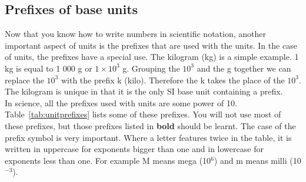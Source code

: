 \subsection*{Prefixes of base units}
            \nopagebreak
Now that you know how to write numbers in scientific notation, another important aspect of units is the prefixes that are used with the units. In the case of units, the prefixes have a special use. The kilogram (kg) is a simple example. 1 kg is equal to 1 000 g or $1\ensuremath{\times}{10}^{3}$ g. Grouping the ${10}^{3}$ and the g together we can replace the ${10}^{3}$ with the prefix k (kilo). Therefore the k takes the place of the ${10}^{3}$. The kilogram is unique in that it is the only SI base unit containing a prefix.\\
In science, all the prefixes used with units are some power of 10. Table~\ref{tab:unitprefixes} lists some of these prefixes. You will not use most of these prefixes, but those prefixes listed in \textbf{bold} should be learnt. The case of the prefix symbol is very important. Where a letter features twice in the table, it is written in uppercase for exponents bigger than one and in lowercase for exponents less than one. For example M means mega (10${}^{6}$) and m means milli (10${}^{-3}$).


